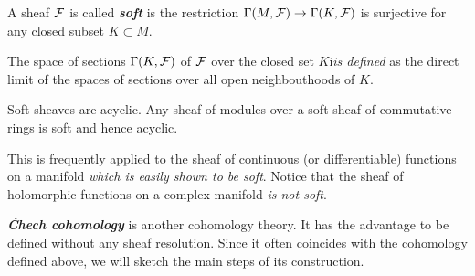 \begin{defn}
	A sheaf $\mathcal{F}$ is called \textbf{\textit{soft}} is the restriction $\Gamma(M,\mathcal{F})\to\Gamma(K,\mathcal{F})$ is surjective for any closed subset $K\subset M$.
	
	The space of sections $\Gamma(K,\mathcal{F})$ of $\mathcal{F}$ over the closed set $K$i\textit{is defined} as the direct limit of the spaces of sections over all open neighbouthoods of $K$.
\end{defn}
\begin{prop}
	Soft sheaves are acyclic. Any sheaf of modules over a soft sheaf of commutative rings is soft and hence acyclic.
\end{prop}
\begin{remark}
	This is frequently applied to the sheaf of continuous (or differentiable) functions on a manifold \textit{which is easily shown to be soft}. Notice that the sheaf of holomorphic functions on a complex manifold \textit{is not soft}.
\end{remark}

\textbf{\textit{\v Chech cohomology}} is another cohomology theory. It has the advantage to be defined without any sheaf resolution. Since it often coincides with the cohomology defined above, we will sketch the main steps of its construction.

